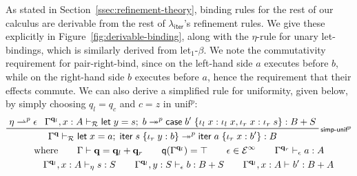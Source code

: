 \documentclass[acmsmall,screen,anonymous,review]{acmart}
\newcommand{\mc}[1]{\ensuremath{\mathcal{#1}}}
\newcommand{\mb}[1]{\ensuremath{\mathbf{#1}}}
\newcommand{\ms}[1]{\ensuremath{\mathsf{#1}}}
\newcommand{\lto}{:}
\newcommand{\linl}[1]{\iota_l\;{#1}}
\newcommand{\linr}[1]{\iota_r\;{#1}}
\newcommand{\letexpr}[3]{\ensuremath{\ms{let}\;#1 = #2;\;#3}}
\newcommand{\caseexpr}[5]{\ms{case}\;#1\;\{\linl{#2} \lto #3, \linr{#4} \lto #5\}}
\newcommand{\liter}[3]{\ms{iter}\;#1\;\{ \linr{#2} \lto #3 \}}
\newcommand{\einf}[1]{#1 \in \mc{E}^\infty}
\newcommand{\qsp}[4]{#1 \vdash #2 = #3 + #4}
\newcommand{\rle}[1]{{\scriptsize\textsf{#1}}}
\newcommand{\hasty}[4]{#1 \vdash_{#2} #3: {#4}}
\newcommand{\tref}{\twoheadrightarrow}
\newcommand{\tmlep}[6]{#1 \vdash_{#2} #3 \tref^{#6} #4 : {#5}}
\newcommand{\brle}[1]{{\textsf{#1}}}
\newcommand{\subiterexp}{\texorpdfstring{\(\lambda_{\ms{iter}}\)}{lambda-iter}}
\newcommand{\rightmove}{\rightharpoonup}
\newcommand{\alquant}{\ms{q}}
\begin{document}
As stated in Section~\ref{ssec:refinement-theory}, binding rules for the rest of our calculus are
derivable from the rest of \subiterexp{}'s refinement rules. We give these explicitly in
Figure~\ref{fig:derivable-binding}, along with the $\eta$-rule for unary let-bindings, which is
similarly derived from \brle{let$_1$-$\beta$}. We note the commutativity requirement for
\brle{pair-right-bind}, since on the left-hand side $a$ executes before $b$, while on the right-hand
side $b$ executes before $a$, hence the requirement that their effects commute. We can also derive a
simplified rule for uniformity, given below, by simply choosing $q_l = q_c$ and $c = z$ in
\brle{unif$^p$}:
  \begin{gather*}
    \prftree[r]{\rle{simp-unif$^p$}}
      {\eta \rightmove^p \epsilon}
      {\tmlep{\Gamma^{\mb{q}_l}, x : A}{\mc{R}}
        {\letexpr{y}{s}{b}}
        {\caseexpr{b'}{x}{\linl{x}}{x}{\linr{s}}}{B + S}{p}}
      {
        \tmlep{\Gamma^{\mb{q}}}
          {\mc{R}}
          {\letexpr{x}{a}{\liter{s}{y}{b}}}
          {\liter{a}{x}{b'}}
          {B}
          {p}
      } \\
    \text{where} \qquad {\qsp{\Gamma}{\mb{q}}{\mb{q}_l}{\mb{q}_r}} \qquad
    \alquant(\Gamma^{\mb{q}_l}) = \top \qquad
    \einf{\epsilon} \qquad {\hasty{\Gamma^{\mb{q}_r}}{\epsilon}{a}{A}}
    \\
    \qquad {\hasty{\Gamma^{\mb{q}_l}, x : A}{\eta}{s}{S}}
    \qquad {\hasty{\Gamma^{\mb{q}_l}, y : S}{\epsilon}{b}{B + S}}
    \qquad {\hasty{\Gamma^{\mb{q}_l}, x : A}{}{b'}{B + A}}
  \end{gather*}
\end{document}
